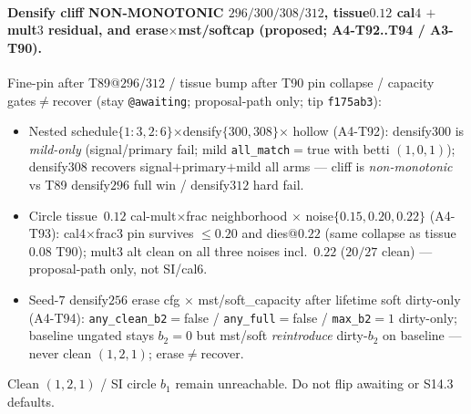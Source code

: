 \documentclass[11pt]{article}
\begin{document}
\paragraph{Densify cliff NON-MONOTONIC $296/300/308/312$, tissue$0.12$
cal$4$ $+$ mult$3$ residual, and erase$\times$mst/softcap (proposed;
A4-T92..T94 / A3-T90).}
Fine-pin after T89@$296$/$312$ / tissue bump after T90 pin collapse /
capacity gates$\neq$recover (stay \texttt{@awaiting}; proposal-path only;
tip \texttt{f175ab3}):
\begin{itemize}[leftmargin=1.5em]
  \item Nested schedule$\{1{:}3,2{:}6\}$$\times$densify$\{300,308\}$$\times$
  hollow (A4-T92): densify$300$ is \emph{mild-only}
  (signal/primary fail; mild \texttt{all\_match}${=}$true with betti
  $(1,0,1)$); densify$308$ recovers signal$+$primary$+$mild all arms ---
  cliff is \emph{non-monotonic} vs T89 densify$296$ full win /
  densify$312$ hard fail.
  \item Circle tissue~$0.12$ cal-mult$\times$frac neighborhood $\times$
  noise$\{0.15,0.20,0.22\}$ (A4-T93): cal$4$$\times$frac$3$ pin survives
  $\le 0.20$ and dies@$0.22$ (same collapse as tissue$0.08$ T90);
  mult$3$ alt clean on all three noises incl.\ $0.22$ ($20/27$ clean) ---
  proposal-path only, not SI/cal$6$.
  \item Seed-$7$ densify$256$ erase cfg $\times$ mst/soft\_capacity
  after lifetime soft dirty-only (A4-T94): \texttt{any\_clean\_b2}${=}$false /
  \texttt{any\_full}${=}$false / \texttt{max\_b2}${=}1$ dirty-only;
  baseline ungated stays $b_2{=}0$ but mst/soft \emph{reintroduce}
  dirty-$b_2$ on baseline --- never clean $(1,2,1)$; erase$\neq$recover.
\end{itemize}
Clean $(1,2,1)$ / SI circle $b_1$ remain unreachable. Do not flip
awaiting or S14.3 defaults.
\end{document}
